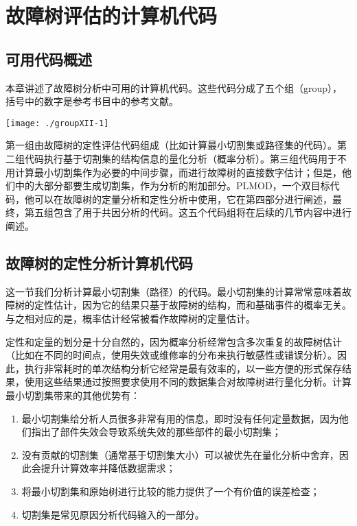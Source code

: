 \documentclass[cn,11pt,chinese]{elegantbook}
\begin{document}
{\chapter{故障树评估的计算机代码}
\section{可用代码概述}

本章讲述了故障树分析中可用的计算机代码。这些代码分成了五个组（group），括号中的数字是参考书目中的参考文献。

\texttt{[image: ./groupXII-1]}



第一组由故障树的定性评估代码组成（比如计算最小切割集或路径集的代码）。第二组代码执行基于切割集的结构信息的量化分析（概率分析）。第三组代码用于不用计算最小切割集作为必要的中间步骤，而进行故障树的直接数字估计；但是，他们中的大部分都要生成切割集，作为分析的附加部分。PLMOD，一个双目标代码，他可以在故障树的定量分析和定性分析中使用，它在第四部分进行阐述，最终，第五组包含了用于共因分析的代码。这五个代码组将在后续的几节内容中进行阐述。

\section{故障树的定性分析计算机代码}

这一节我们分析计算最小切割集（路径）的代码。最小切割集的计算常常意味着故障树的定性估计，因为它的结果只基于故障树的结构，而和基础事件的概率无关。与之相对应的是，概率估计经常被看作故障树的定量估计。

定性和定量的划分是十分自然的，因为概率分析经常包含多次重复的故障树估计（比如在不同的时间点，使用失效或维修率的分布来执行敏感性或错误分析）。因此，执行非常耗时的单次结构分析它经常是最有效率的，以一些方便的形式保存结果，使用这些结果通过按照要求使用不同的数据集合对故障树进行量化分析。计算最小切割集带来的其他优势有：  
\begin{enumerate}
	\item 最小切割集给分析人员很多非常有用的信息，即时没有任何定量数据，因为他们指出了部件失效会导致系统失效的那些部件的最小切割集；  
\item 没有贡献的切割集（通常基于切割集大小）可以被优先在量化分析中舍弃，因此会提升计算效率并降低数据需求；  
\item 将最小切割集和原始树进行比较的能力提供了一个有价值的误差检查；  
\item 切割集是常见原因分析代码输入的一部分。
\end{enumerate}

}
\end{document}
